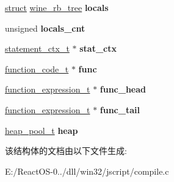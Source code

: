 \begin{DoxyCompactItemize}
\hyperlink{interfacestruct}{struct} \hyperlink{structwine__rb__tree}{wine\+\_\+rb\+\_\+tree} {\bfseries locals}
\item 
\mbox{\label{structcompiler__ctx__t_a42053e7274b0d013dfb9e6c2f13ae13c}} 
unsigned {\bfseries locals\+\_\+cnt}
\item 
\mbox{\label{structcompiler__ctx__t_a47c259042c76a7ed38ac3169f1a61efe}} 
\hyperlink{struct__statement__ctx__t}{statement\+\_\+ctx\+\_\+t} $\ast$ {\bfseries stat\+\_\+ctx}
\item 
\mbox{\label{structcompiler__ctx__t_a4fad10d2b98cd571b3605d271a4a918a}} 
\hyperlink{struct__function__code__t}{function\+\_\+code\+\_\+t} $\ast$ {\bfseries func}
\item 
\mbox{\label{structcompiler__ctx__t_ad914d02cc9923e91dda708b76c6df676}} 
\hyperlink{struct__function__expression__t}{function\+\_\+expression\+\_\+t} $\ast$ {\bfseries func\+\_\+head}
\item 
\mbox{\label{structcompiler__ctx__t_a422b9af52be18a8c146ac4ef9ecb6eb6}} 
\hyperlink{struct__function__expression__t}{function\+\_\+expression\+\_\+t} $\ast$ {\bfseries func\+\_\+tail}
\item 
\mbox{\label{structcompiler__ctx__t_a9c236b145b32cfd037875fa2a97335d6}} 
\hyperlink{structheap__pool__t}{heap\+\_\+pool\+\_\+t} {\bfseries heap}
\end{DoxyCompactItemize}


该结构体的文档由以下文件生成\+:\begin{DoxyCompactItemize}
\item 
E\+:/\+React\+O\+S-\/0../dll/win32/jscript/compile.\+c\end{DoxyCompactItemize}
